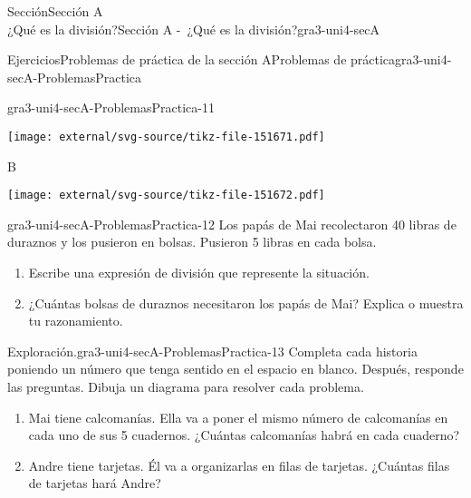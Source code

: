 \begin{sectionptx}{Sección}{{\Large Sección A\\}¿Qué es la división?}{}{Sección A -~¿Qué es la división?}{}{}{gra3-uni4-secA}
\begin{exercises-subsection}{Ejercicios}{Problemas de práctica de la sección A}{}{Problemas de práctica}{}{}{gra3-uni4-secA-ProblemasPractica}
\begin{divisionexercise}{9}{}{}{gra3-uni4-secA-ProblemasPractica-11}
\begin{enumerate}[label={(\alph*)}]
\begin{sidebyside}{2}{0}{0}{0}
\begin{sbspanel}{0.93}
\texttt{[image: external/svg-source/tikz-file-151671.pdf]}
\end{sbspanel}%
\end{sidebyside}%
\begin{sidebyside}{2}{0}{0}{0}%
\begin{sbspanel}{0.07}%
B%
\end{sbspanel}%
\begin{sbspanel}{0.93}%
\texttt{[image: external/svg-source/tikz-file-151672.pdf]}
\end{sbspanel}%
\end{sidebyside}%
\end{enumerate}
%
\end{divisionexercise}%
\begin{divisionexercise}{10}{}{}{gra3-uni4-secA-ProblemasPractica-12}%
Los papás de Mai recolectaron 40 libras de duraznos y los pusieron en bolsas. Pusieron 5 libras en cada bolsa.%
\par
%
\begin{enumerate}[label={(\alph*)}]
\item{}Escribe una expresión de división que represente la situación.%
\item{}¿Cuántas bolsas de duraznos necesitaron los papás de Mai? Explica o muestra tu razonamiento.%
\end{enumerate}
%
\end{divisionexercise}%
\begin{divisionexercise}{11}{Exploración.}{}{gra3-uni4-secA-ProblemasPractica-13}%
Completa cada historia poniendo un número que tenga sentido en el espacio en blanco. Después, responde las preguntas. Dibuja un diagrama para resolver cada problema.%
\par
%
\begin{enumerate}[label={(\alph*)}]
\item{}Mai tiene \textunderscore{}\textunderscore{}\textunderscore{}\textunderscore{}\textunderscore{}\textunderscore{}\textunderscore{}\textunderscore{}\textunderscore{}\textunderscore{} calcomanías. Ella va a poner el mismo número de calcomanías en cada uno de sus 5 cuadernos. ¿Cuántas calcomanías habrá en cada cuaderno?%
\item{}Andre tiene \textunderscore{}\textunderscore{}\textunderscore{}\textunderscore{}\textunderscore{}\textunderscore{}\textunderscore{}\textunderscore{}\textunderscore{}\textunderscore{} tarjetas. Él va a organizarlas en filas de \textunderscore{}\textunderscore{}\textunderscore{}\textunderscore{}\textunderscore{}\textunderscore{}\textunderscore{}\textunderscore{}\textunderscore{}\textunderscore{} tarjetas. ¿Cuántas filas de tarjetas hará Andre?%

\end{enumerate}
\end{divisionexercise}
\end{exercises-subsection}
\end{sectionptx}
